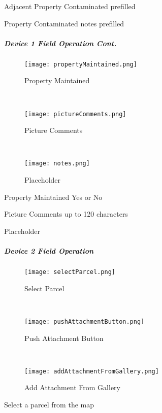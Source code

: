 \documentclass[class=book , crop=false, titlepage, twoside, multi={itemize, figure, verbatim}, float=false]{standalone}
\begin{document}
\noindent Adjacent Property Contaminated prefilled
\vspace{2in}

\noindent Property Contaminated notes prefilled
\clearpage
%
%
%
\subparagraph*{Device 1 Field Operation Cont.}
%
%
\begin{wrapfigure}{r}{0.4\textwidth}
\centering
\texttt{[image: propertyMaintained.png]}
\caption {Property Maintained}
\vspace{.1in}

\HRule \\[.4cm] %
\vspace{.1in}

\texttt{[image: pictureComments.png]}
\caption{Picture Comments}
\vspace{.1in}

\HRule \\[.4cm] %
\vspace{.1in}

\texttt{[image: notes.png]}
\caption{Placeholder}
\end{wrapfigure}
Property Maintained Yes or No
\vspace{2.5in}

\noindent Picture Comments up to 120 characters
\vspace{2.5in}

\noindent Placeholder
\clearpage
%
%
%
\subparagraph{Device 2 Field Operation}

%
%
\begin{wrapfigure}{r}{0.4\textwidth}
\centering
\texttt{[image: selectParcel.png]}
\caption {Select Parcel}
\vspace{.1in}

\HRule \\[.4cm] %
\vspace{.1in}

\texttt{[image: pushAttachmentButton.png]}
\caption{Push Attachment Button}
\vspace{.1in}

\HRule \\[.4cm] %
\vspace{.05in}

\texttt{[image: addAttachmentFromGallery.png]}
\caption{Add Attachment From Gallery}
\end{wrapfigure}
Select a parcel from the map
\vspace{2in}
\end{document}
